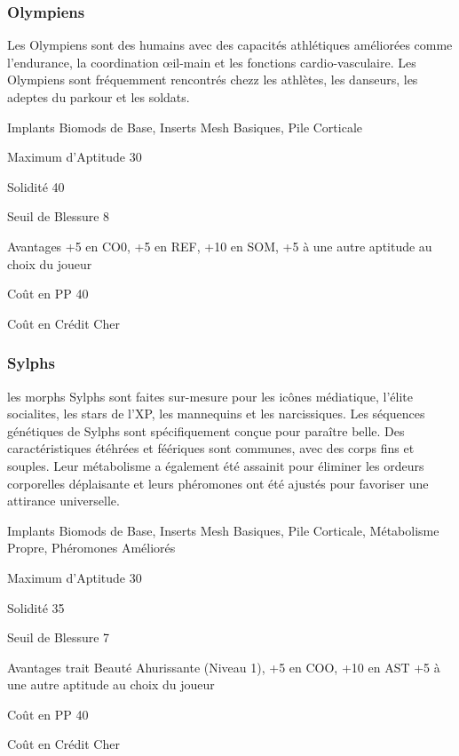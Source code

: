 \subsubsection{Olympiens} \label{sec:starting-olympians} 

Les Olympiens sont des humains avec des capacités athlétiques améliorées comme l'endurance, la coordination œil-main et les fonctions cardio-vasculaire. Les Olympiens sont fréquemment rencontrés chezz les athlètes, les danseurs, les adeptes du parkour et les soldats. 

\begin{description*} \item[Implants] Biomods de Base, Inserts Mesh Basiques, Pile Corticale\item[Maximum d'Aptitude] 30 \item[Solidité] 40 \item[Seuil de Blessure] 8 \item[Avantages] +5 en CO0, +5 en REF, +10 en SOM, +5 à une autre aptitude au choix du joueur\item[Coût en PP] 40 \item[Coût en Crédit] Cher \end{description*} 

\subsubsection{Sylphs} \label{sec:starting-sylphs} 

les morphs Sylphs sont faites sur-mesure pour les icônes médiatique, l'élite socialites, les stars de l'XP, les mannequins et les narcissiques. Les séquences génétiques de Sylphs sont spécifiquement conçue pour paraître belle. Des caractéristiques étéhrées et féériques sont communes, avec des corps fins et souples. Leur métabolisme a également été assainit pour éliminer les ordeurs corporelles déplaisante et leurs phéromones ont été ajustés pour favoriser une attirance universelle. 

\begin{description*} \item[Implants] Biomods de Base, Inserts Mesh Basiques, Pile Corticale, Métabolisme Propre, Phéromones Améliorés\item[Maximum d'Aptitude] 30 \item[Solidité] 35 \item[Seuil de Blessure] 7 \item[Avantages] trait Beauté Ahurissante (Niveau 1), +5 en COO, +10 en AST +5 à une autre aptitude au choix du joueur\item[Coût en PP] 40 \item[Coût en Crédit] Cher \end{description*} 


